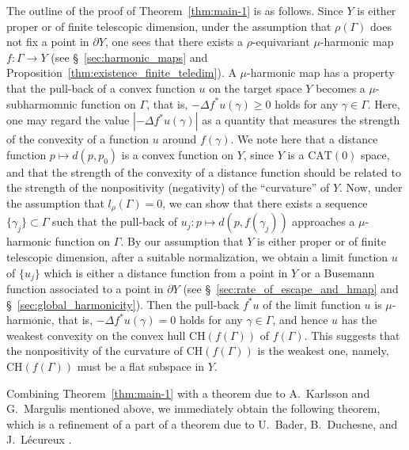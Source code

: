 \documentclass[12pt]{amsart}
\numberwithin{equation}{section}
\theoremstyle{plain}
\theoremstyle{definition}
\theoremstyle{remark}
\newcommand{\cat}[1]{\mathrm{CAT}(#1)}
\newcommand{\ch}[1]{\mathrm{CH}(#1)}
\begin{document}
 The outline of the proof of Theorem~\ref{thm:main-1} is as follows.  
 Since $Y$ is either proper or of finite telescopic dimension, under the
 assumption that $\rho(\Gamma)$ does not fix a point in $\partial Y$,
 one sees that there exists a $\rho$-equivariant $\mu$-harmonic map 
 $f\colon\Gamma \rightarrow Y$ (see \S~\ref{sec:harmonic_maps} and
 Proposition~\ref{thm:existence_finite_teledim}). 
 A $\mu$-harmonic map has a property that the pull-back of a convex
 function $u$ on the target space $Y$ becomes a $\mu$-subharmomnic
 function on $\Gamma$, that is, $-\Delta f^*u(\gamma)\geq 0$ holds for
 any $\gamma \in \Gamma$.
 Here, one may regard the value 
 $|-\Delta f^*u(\gamma)|$ as a quantity that measures the strength of
 the convexity of a function $u$ around $f(\gamma)$. 
 We note here that a distance function $p\mapsto d(p,p_0)$ is a convex
 function on $Y$, since $Y$ is a $\cat{0}$ space, 
 and that the strength of the convexity of a distance function should be
 related to the strength of the nonpositivity (negativity) of the
 ``curvature'' of $Y$. 
 Now, under the assumption that $l_{\rho}(\Gamma)=0$, we can 
 show that there exists a sequence $\{\gamma_j\}\subset \Gamma$ such that 
 the pull-back of $u_j\colon p \mapsto d(p, f(\gamma_j))$ 
 approaches a $\mu$-harmonic function on $\Gamma$. 
 By our assumption that $Y$ is either proper or of finite telescopic
 dimension, after a suitable normalization, we obtain a limit function
 $u$ of $\{u_j\}$ which is either a distance function from a point in
 $Y$ or a Busemann function associated to a point in $\partial Y$
 (see \S~\ref{sec:rate_of_escape_and_hmap} and
 \S~\ref{sec:global_harmonicity}). 
 Then the pull-back $f^*u$ of the limit function $u$ is $\mu$-harmonic,
 that is, $-\Delta f^*u(\gamma)=0$ holds for any $\gamma \in \Gamma$,
 and hence $u$ has the weakest convexity on the convex hull
 $\ch{f(\Gamma)}$ of $f(\Gamma)$. 
 This suggests that the nonpositivity of the curvature of
 $\ch{f(\Gamma)}$ is the weakest one, namely, $\ch{f(\Gamma)}$ must be
 a flat subspace in $Y$. 

 Combining Theorem~\ref{thm:main-1} with a theorem due to A.~Karlsson
 and G.~Margulis mentioned above, we immediately obtain the following
 theorem, which is a refinement of a part of a theorem due to U.~Bader,
 B.~Duchesne, and J.~L\'ecureux 
 \cite[Theorem 1.1]{bader-duchesne-lecureux}. 
\end{document}
